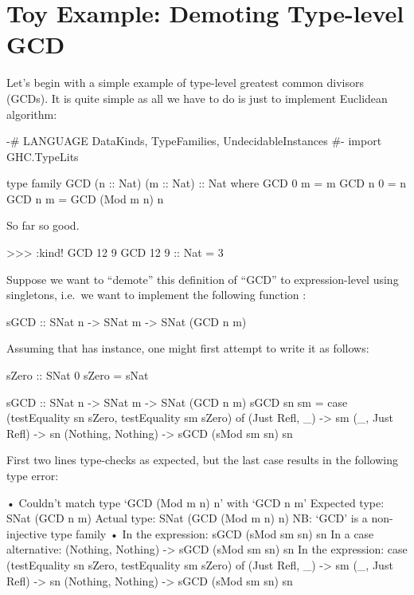 \documentclass[demotion-paper.tex]{subfiles}
\begin{document}
\section{Toy Example: Demoting Type-level GCD}
\label{sec:gcd}
Let's begin with a simple example of type-level greatest common divisors (GCDs).
It is quite simple as all we have to do is just to implement Euclidean algorithm:


\begin{code}
{-# LANGUAGE DataKinds, TypeFamilies, UndecidableInstances #-}
import GHC.TypeLits

type family GCD (n :: Nat) (m :: Nat) :: Nat where
  GCD 0 m = m
  GCD n 0 = n
  GCD n m = GCD (Mod m n) n
\end{code}

So far so good.

\begin{repl}
>>> :kind! GCD 12 9
GCD 12 9 :: Nat
= 3
\end{repl}

Suppose we want to ``demote'' this definition of ``GCD'' to expression-level using singletons, i.e.\ we want to implement the following function :

\begin{code}
sGCD :: SNat n -> SNat m -> SNat (GCD n m)
\end{code}

Assuming that  has  instance, one might first attempt to write it as follows:

\begin{code}
sZero :: SNat 0
sZero = sNat

sGCD :: SNat n -> SNat m -> SNat (GCD n m)
sGCD sn sm = case (testEquality sn sZero, testEquality sm sZero) of
  (Just Refl, _) -> sm
  (_, Just Refl) -> sn
  (Nothing, Nothing) -> sGCD (sMod sm sn) sn
\end{code}

First two lines type-checks as expected, but the last case results in the following type error:

\begin{repl}
• Couldn't match type ‘GCD (Mod m n) n’ with ‘GCD n m’
  Expected type: SNat (GCD n m)
    Actual type: SNat (GCD (Mod m n) n)
  NB: ‘GCD’ is a non-injective type family
• In the expression: sGCD (sMod sm sn) sn
  In a case alternative: (Nothing, Nothing) -> sGCD (sMod sm sn) sn
  In the expression:
    case (testEquality sn sZero, testEquality sm sZero) of
      (Just Refl, _) -> sm
      (_, Just Refl) -> sn
      (Nothing, Nothing) -> sGCD (sMod sm sn) sn
\end{repl}
\end{document}
